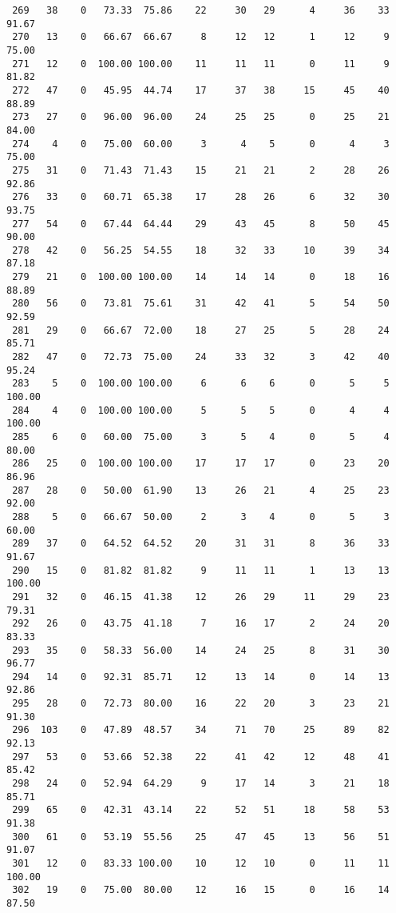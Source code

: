 \begin{verbatim}
 269   38    0   73.33  75.86    22     30   29      4     36    33    91.67
 270   13    0   66.67  66.67     8     12   12      1     12     9    75.00
 271   12    0  100.00 100.00    11     11   11      0     11     9    81.82
 272   47    0   45.95  44.74    17     37   38     15     45    40    88.89
 273   27    0   96.00  96.00    24     25   25      0     25    21    84.00
 274    4    0   75.00  60.00     3      4    5      0      4     3    75.00
 275   31    0   71.43  71.43    15     21   21      2     28    26    92.86
 276   33    0   60.71  65.38    17     28   26      6     32    30    93.75
 277   54    0   67.44  64.44    29     43   45      8     50    45    90.00
 278   42    0   56.25  54.55    18     32   33     10     39    34    87.18
 279   21    0  100.00 100.00    14     14   14      0     18    16    88.89
 280   56    0   73.81  75.61    31     42   41      5     54    50    92.59
 281   29    0   66.67  72.00    18     27   25      5     28    24    85.71
 282   47    0   72.73  75.00    24     33   32      3     42    40    95.24
 283    5    0  100.00 100.00     6      6    6      0      5     5   100.00
 284    4    0  100.00 100.00     5      5    5      0      4     4   100.00
 285    6    0   60.00  75.00     3      5    4      0      5     4    80.00
 286   25    0  100.00 100.00    17     17   17      0     23    20    86.96
 287   28    0   50.00  61.90    13     26   21      4     25    23    92.00
 288    5    0   66.67  50.00     2      3    4      0      5     3    60.00
 289   37    0   64.52  64.52    20     31   31      8     36    33    91.67
 290   15    0   81.82  81.82     9     11   11      1     13    13   100.00
 291   32    0   46.15  41.38    12     26   29     11     29    23    79.31
 292   26    0   43.75  41.18     7     16   17      2     24    20    83.33
 293   35    0   58.33  56.00    14     24   25      8     31    30    96.77
 294   14    0   92.31  85.71    12     13   14      0     14    13    92.86
 295   28    0   72.73  80.00    16     22   20      3     23    21    91.30
 296  103    0   47.89  48.57    34     71   70     25     89    82    92.13
 297   53    0   53.66  52.38    22     41   42     12     48    41    85.42
 298   24    0   52.94  64.29     9     17   14      3     21    18    85.71
 299   65    0   42.31  43.14    22     52   51     18     58    53    91.38
 300   61    0   53.19  55.56    25     47   45     13     56    51    91.07
 301   12    0   83.33 100.00    10     12   10      0     11    11   100.00
 302   19    0   75.00  80.00    12     16   15      0     16    14    87.50

\end{verbatim}
